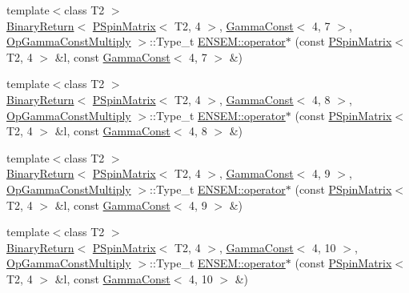 \begin{DoxyCompactItemize}
\item 
{\footnotesize template$<$class T2 $>$ }\\\mbox{\hyperlink{structENSEM_1_1BinaryReturn}{Binary\+Return}}$<$ \mbox{\hyperlink{classENSEM_1_1PSpinMatrix}{P\+Spin\+Matrix}}$<$ T2, 4 $>$, \mbox{\hyperlink{classENSEM_1_1GammaConst}{Gamma\+Const}}$<$ 4, 7 $>$, \mbox{\hyperlink{structENSEM_1_1OpGammaConstMultiply}{Op\+Gamma\+Const\+Multiply}} $>$\+::Type\+\_\+t \mbox{\hyperlink{group__primspinmatrix_gaf6e9dc0eef99b0575741077a24d33399}{E\+N\+S\+E\+M\+::operator$\ast$}} (const \mbox{\hyperlink{classENSEM_1_1PSpinMatrix}{P\+Spin\+Matrix}}$<$ T2, 4 $>$ \&l, const \mbox{\hyperlink{classENSEM_1_1GammaConst}{Gamma\+Const}}$<$ 4, 7 $>$ \&)
\item 
{\footnotesize template$<$class T2 $>$ }\\\mbox{\hyperlink{structENSEM_1_1BinaryReturn}{Binary\+Return}}$<$ \mbox{\hyperlink{classENSEM_1_1PSpinMatrix}{P\+Spin\+Matrix}}$<$ T2, 4 $>$, \mbox{\hyperlink{classENSEM_1_1GammaConst}{Gamma\+Const}}$<$ 4, 8 $>$, \mbox{\hyperlink{structENSEM_1_1OpGammaConstMultiply}{Op\+Gamma\+Const\+Multiply}} $>$\+::Type\+\_\+t \mbox{\hyperlink{group__primspinmatrix_ga309ed45c5c034e83f1f24061ca0a5cdc}{E\+N\+S\+E\+M\+::operator$\ast$}} (const \mbox{\hyperlink{classENSEM_1_1PSpinMatrix}{P\+Spin\+Matrix}}$<$ T2, 4 $>$ \&l, const \mbox{\hyperlink{classENSEM_1_1GammaConst}{Gamma\+Const}}$<$ 4, 8 $>$ \&)
\item 
{\footnotesize template$<$class T2 $>$ }\\\mbox{\hyperlink{structENSEM_1_1BinaryReturn}{Binary\+Return}}$<$ \mbox{\hyperlink{classENSEM_1_1PSpinMatrix}{P\+Spin\+Matrix}}$<$ T2, 4 $>$, \mbox{\hyperlink{classENSEM_1_1GammaConst}{Gamma\+Const}}$<$ 4, 9 $>$, \mbox{\hyperlink{structENSEM_1_1OpGammaConstMultiply}{Op\+Gamma\+Const\+Multiply}} $>$\+::Type\+\_\+t \mbox{\hyperlink{group__primspinmatrix_ga25cb4484aedd17ae7862bb37c00fb7e0}{E\+N\+S\+E\+M\+::operator$\ast$}} (const \mbox{\hyperlink{classENSEM_1_1PSpinMatrix}{P\+Spin\+Matrix}}$<$ T2, 4 $>$ \&l, const \mbox{\hyperlink{classENSEM_1_1GammaConst}{Gamma\+Const}}$<$ 4, 9 $>$ \&)
\item 
{\footnotesize template$<$class T2 $>$ }\\\mbox{\hyperlink{structENSEM_1_1BinaryReturn}{Binary\+Return}}$<$ \mbox{\hyperlink{classENSEM_1_1PSpinMatrix}{P\+Spin\+Matrix}}$<$ T2, 4 $>$, \mbox{\hyperlink{classENSEM_1_1GammaConst}{Gamma\+Const}}$<$ 4, 10 $>$, \mbox{\hyperlink{structENSEM_1_1OpGammaConstMultiply}{Op\+Gamma\+Const\+Multiply}} $>$\+::Type\+\_\+t \mbox{\hyperlink{group__primspinmatrix_ga84b4002a13db59637f1e0b23a7382a52}{E\+N\+S\+E\+M\+::operator$\ast$}} (const \mbox{\hyperlink{classENSEM_1_1PSpinMatrix}{P\+Spin\+Matrix}}$<$ T2, 4 $>$ \&l, const \mbox{\hyperlink{classENSEM_1_1GammaConst}{Gamma\+Const}}$<$ 4, 10 $>$ \&)

\end{DoxyCompactItemize}
